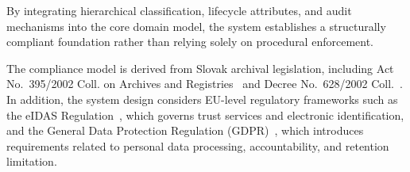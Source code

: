By integrating hierarchical classification, lifecycle attributes, and audit mechanisms into the core domain model, 
the system establishes a structurally compliant foundation rather than relying solely on procedural enforcement.

The compliance model is derived from Slovak archival legislation, including Act No.~395/2002 Coll. on Archives and Registries~\cite{zakon395} 
and Decree No.~628/2002 Coll.~\cite{vyhlaska628}. 
In addition, the system design considers EU-level regulatory frameworks such as the eIDAS Regulation~\cite{eidas}, 
which governs trust services and electronic identification, and the General Data Protection Regulation (GDPR)~\cite{gdpr2016}, 
which introduces requirements related to personal data processing, accountability, and retention limitation.
